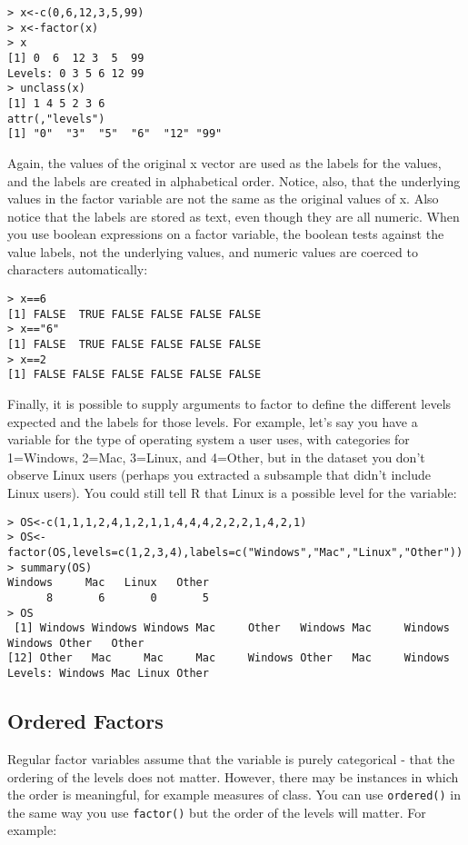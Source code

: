 \documentclass[12pt, oneside]{amsart}   	%
\begin{document}
\begin{verbatim}
> x<-c(0,6,12,3,5,99)
> x<-factor(x)
> x
[1] 0  6  12 3  5  99
Levels: 0 3 5 6 12 99
> unclass(x)
[1] 1 4 5 2 3 6
attr(,"levels")
[1] "0"  "3"  "5"  "6"  "12" "99"
\end{verbatim}

Again, the values of the original x vector are used as the labels for the values, and the labels are created in alphabetical order. Notice, also, that the underlying values in the factor variable are not the same as the original values of x. Also notice that the labels are stored as text, even though they are all numeric. When you use boolean expressions on a factor variable, the boolean tests against the value labels, not the underlying values, and numeric values are coerced to characters automatically:

\begin{verbatim}
> x==6
[1] FALSE  TRUE FALSE FALSE FALSE FALSE
> x=="6"
[1] FALSE  TRUE FALSE FALSE FALSE FALSE
> x==2
[1] FALSE FALSE FALSE FALSE FALSE FALSE
\end{verbatim}

Finally, it is possible to supply arguments to factor to define the different levels expected and the labels for those levels. For example, let's say you have a variable for the type of operating system a user uses, with categories for 1=Windows, 2=Mac, 3=Linux, and 4=Other, but in the dataset you don't observe Linux users (perhaps you extracted a subsample that didn't include Linux users). You could still tell R that Linux is a possible level for the variable:

\begin{verbatim}
> OS<-c(1,1,1,2,4,1,2,1,1,4,4,4,2,2,2,1,4,2,1)
> OS<-factor(OS,levels=c(1,2,3,4),labels=c("Windows","Mac","Linux","Other"))
> summary(OS)
Windows     Mac   Linux   Other 
      8       6       0       5 
> OS
 [1] Windows Windows Windows Mac     Other   Windows Mac     Windows Windows Other   Other  
[12] Other   Mac     Mac     Mac     Windows Other   Mac     Windows
Levels: Windows Mac Linux Other
\end{verbatim}

\subsection{Ordered Factors}

Regular factor variables assume that the variable is purely categorical - that the ordering of the levels does not matter. However, there may be instances in which the order is meaningful, for example measures of class. You can use \texttt{ordered()} in the same way you use \texttt{factor()} but the order of the levels will matter. For example:
\end{document}
